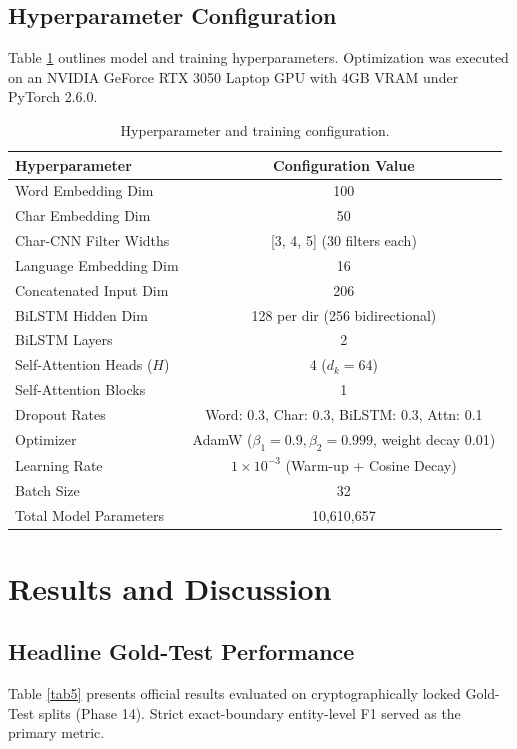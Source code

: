 \documentclass[default,iicol]{sn-jnl}
\begin{document}
\subsection{Hyperparameter Configuration}
Table \ref{tab4} outlines model and training hyperparameters. Optimization was executed on an NVIDIA GeForce RTX 3050 Laptop GPU with 4GB VRAM under PyTorch 2.6.0.

\begin{table}[h]
\caption{Hyperparameter and training configuration.}\label{tab4}
\centering
\begin{tabular}{lc}
\toprule
Hyperparameter & Configuration Value \\
\midrule
Word Embedding Dim & 100 \\
Char Embedding Dim & 50 \\
Char-CNN Filter Widths & [3, 4, 5] (30 filters each) \\
Language Embedding Dim & 16 \\
Concatenated Input Dim & 206 \\
BiLSTM Hidden Dim & 128 per dir (256 bidirectional) \\
BiLSTM Layers & 2 \\
Self-Attention Heads ($H$) & 4 ($d_k = 64$) \\
Self-Attention Blocks & 1 \\
Dropout Rates & Word: 0.3, Char: 0.3, BiLSTM: 0.3, Attn: 0.1 \\
Optimizer & AdamW ($\beta_1=0.9, \beta_2=0.999$, weight decay 0.01) \\
Learning Rate & $1 \times 10^{-3}$ (Warm-up + Cosine Decay) \\
Batch Size & 32 \\
Total Model Parameters & 10,610,657 \\
\bottomrule
\end{tabular}
\end{table}

\section{Results and Discussion}\label{sec6}

\subsection{Headline Gold-Test Performance}
Table \ref{tab5} presents official results evaluated on cryptographically locked Gold-Test splits (Phase 14). Strict exact-boundary entity-level F1 served as the primary metric.
\end{document}
